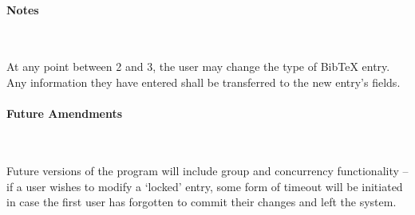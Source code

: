 \paragraph*{Notes} \

At any point between 2 and 3, the user may change the type of BibTeX entry. Any information they have entered shall be transferred to the new entry's fields.

\paragraph*{Future Amendments} \

Future versions of the program will include group and concurrency functionality -- if a user wishes to modify a `locked' entry, some form of timeout will be initiated in case the first user has forgotten to commit their changes and left the system.

